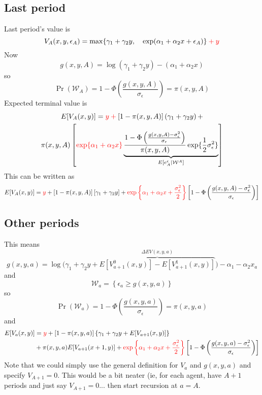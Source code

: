 \documentclass[11pt,letterpaper]{article}
\newcommand*{\mathcolor}{}
\def\mathcolor#1#{\mathcoloraux{#1}}
\newcommand*{\mathcoloraux}[3]{%
  \protect\leavevmode
  \begingroup
    \color#1{#2}#3%
  \endgroup
}
\begin{document}
\subsection{Last period}

Last period's value is
\[
V_A(x,y,\epsilon_A) = \max \{ \gamma_1 + \gamma_2 y, \quad \exp(\alpha_1 + \alpha_2 x + \epsilon_A) \} \mathcolor{red}{+ y}
\]
Now
\[
g(x,y,A) = \log(\gamma_1 + \gamma_2 y) - (\alpha_1 + \alpha_2 x)
\]
so 
\[
\Pr(\mathcal W_A) = 1- \Phi\left(\frac{g(x,y,A)}{\sigma_\epsilon} \right) = \pi(x,y,A)
\]
Expected terminal value is
\begin{multline*}
E[V_A(x,y)] = \mathcolor{red}{y +}
    [1-\pi(x,y,A)]\left(\gamma_1 + \gamma_2 y\right)  + \\
    \pi(x,y,A)    \left[\mathcolor{red}{\exp\{\alpha_1 + \alpha_2 x\}} \underbrace{
    \frac{ 1-\Phi\left( \frac{g(x,y,A) - \sigma_\epsilon^2}{\sigma_\epsilon} \right)}
    {\pi(x,y,A)} \exp\{\frac{1}{2}\sigma^2_\epsilon\} }_{E[e^\epsilon_A|\mathcal W^A]} \right]
\end{multline*}
This can be written as
\[
E[V_A(x,y)] = \mathcolor{red}{y} + 
    [1-\pi(x,y,A)]\left[\gamma_1 + \gamma_2 y\right]  + 
    \mathcolor{red}{ \exp\left\{\alpha_1 + \alpha_2 x + \frac{\sigma_\epsilon^2}{2}\right\}}
    \left[1-\Phi\left( \frac{g(x,y,A) - \sigma_\epsilon^2}{\sigma_\epsilon} \right)\right] 
\]

\subsection{Other periods}
This means
\[
    g(x,y,a) = \log \bigg( \gamma_1 + \gamma_2 y + \overbrace{E[V_{a+1}^0(x,y)] - E[V_{a+1}^1(x,y)]}^{\Delta EV(x,y,a)} \bigg) - \alpha_1 - \alpha_2 x_a 
\]
and
\[
\mathcal W_a = \left\{\epsilon_a \geq g(x,y,a) \right\}
\]
so
\[
\Pr(\mathcal W_a) = 1- \Phi\left(\frac{g(x,y,a)}{\sigma_\epsilon} \right) = \pi(x,y,a)
\]
and
\begin{align*}
E[V_a(x,y)] 
&= \mathcolor{red}{y}  
+ [1-\pi(x,y,a)]\left\{\gamma_1 + \gamma_2 y + E[V_{a+1}(x,y)] \right\}  \\ 
&+ \pi(x,y,a)E[V_{a+1}(x+1,y)] + \mathcolor{red}{ \exp\left\{\alpha_1 + \alpha_2 x + \frac{\sigma_\epsilon^2}{2}\right\}}
    \left[1-\Phi\left( \frac{g(x,y,a) - \sigma_\epsilon^2}{\sigma_\epsilon} \right)\right] 
\end{align*}
Note that we could simply use the general definition for $V_a$ and $g(x,y,a)$ and specify $V_{A+1} = 0$. This would be a bit neater (ie, for each agent, have $A+1$ periods and just say $V_{A+1} = 0$... then start recursion at $a=A$.  
\end{document}
